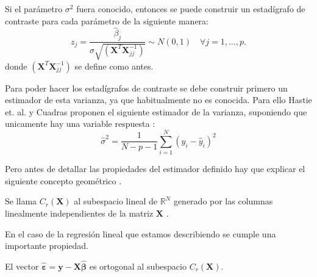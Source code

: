 \noindent Si el parámetro $\sigma^2$ fuera conocido, entonces se puede construir un estadígrafo de contraste para cada parámetro de la siguiente manera: 
\begin{equation}
z_j=\dfrac{\hat{\beta}_j}{\sigma \sqrt{(\mathbf{X}^T\mathbf{X}_{jj}^{-1})}}\sim N(0,1)\quad\forall j=1,\ldots, p.
\end{equation}
\noindent donde $(\mathbf{X}^T\mathbf{X}_{jj}^{-1})$ se define como antes. 

\noindent Para poder hacer los estadígrafos de contraste se debe construir primero un estimador de esta varianza, ya que habitualmente no es conocida. Para ello Hastie et. al. y Cuadras proponen el siguiente estimador de la varianza, suponiendo que unicamente hay una variable respuesta \cite{Cuadras 2014, Hastie 2001}: 
\begin{equation}
\hat{\sigma}^2=\dfrac{1}{N-p-1}\sum_{i=1}^N (y_i-\hat{y}_i)^2 
\end{equation} 

\noindent Pero antes de detallar las propiedades del estimador definido hay que explicar el siguiente concepto geométrico \cite{Cuadras 2014}. 
\begin{defi}
Se llama  $C_{r}(\mathbf{X})$ al subespacio lineal de $\mathbb{R}^{N}$ generado por las columnas linealmente independientes de la matriz $\mathbf{X}$ .
\end{defi}

\noindent En el caso de la regresión lineal que estamos describiendo se cumple una importante propiedad. 
\begin{propo}\label{prop ort}
El vector $\hat{\mathbf{\varepsilon}}=\mathbf{y}-\mathbf{X\hat{\beta}}$ es ortogonal al subespacio $C_{r}(\mathbf{X})$.
\end{propo}

